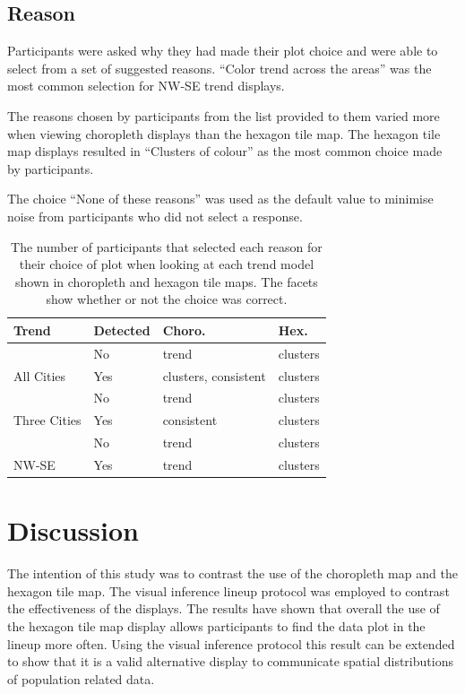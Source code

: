 \documentclass[times, doublespace]{anzsauth}
\begin{document}
\subsection{Reason}\label{reason}

Participants were asked why they had made their plot choice and were
able to select from a set of suggested reasons. ``Color trend across the
areas'' was the most common selection for NW-SE trend displays.

The reasons chosen by participants from the list provided to them varied
more when viewing choropleth displays than the hexagon tile map. The
hexagon tile map displays resulted in ``Clusters of colour'' as the most
common choice made by participants.

The choice ``None of these reasons'' was used as the default value to
minimise noise from participants who did not select a response.

\begin{table}

\caption{\label{tab:reason}The number of participants that selected each reason for their choice of plot when looking at each trend model shown in choropleth and hexagon tile maps. The facets show whether or not the choice was correct.}
\centering
\begin{tabular}[t]{llll}
\toprule
Trend & Detected & Choro. & Hex.\\
\midrule
 & No & trend & clusters\\
\cmidrule{2-4}
\multirow{-2}{*}{\raggedright\arraybackslash All Cities} & Yes & clusters, consistent & clusters\\
\cmidrule{1-4}
 & No & trend & clusters\\
\cmidrule{2-4}
\multirow{-2}{*}{\raggedright\arraybackslash Three Cities} & Yes & consistent & clusters\\
\cmidrule{1-4}
 & No & trend & clusters\\
\cmidrule{2-4}
\multirow{-2}{*}{\raggedright\arraybackslash NW-SE} & Yes & trend & clusters\\
\bottomrule
\end{tabular}
\end{table}

\section{Discussion}\label{discussion}

The intention of this study was to contrast the use of the choropleth
map and the hexagon tile map. The visual inference lineup protocol was
employed to contrast the effectiveness of the displays. The results have
shown that overall the use of the hexagon tile map display allows
participants to find the data plot in the lineup more often. Using the
visual inference protocol this result can be extended to show that it is
a valid alternative display to communicate spatial distributions of
population related data.
\end{document}
